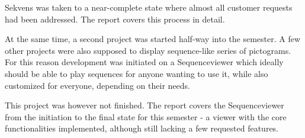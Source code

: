 Sekvens was taken to a near-complete state where almost all customer requests had been addressed. The report covers this process in detail.

At the same time, a second project was started half-way into the semester. A few other projects were also supposed to display sequence-like series of pictograms. For this reason development was initiated on a Sequenceviewer which ideally should be able to play sequences for anyone wanting to use it, while also customized for everyone, depending on their needs.

This project was however not finished. The report covers the Sequenceviewer from the initiation to the final state for this semester - a viewer with the core functionalities implemented, although still lacking a few requested features.